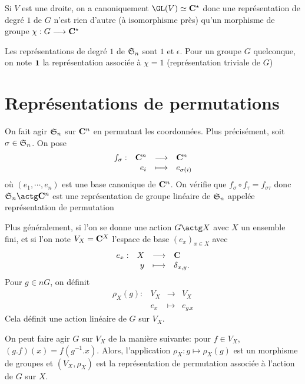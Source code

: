 \begin{rem}
    Si $V$ est une droite, on a canoniquement  $\GL(V)\simeq \C^\star$ donc une représentation de degré $1$ de $G$ n'est rien d'autre (à isomorphisme près) qu'un morphisme de groupe  $\chi : G \longrightarrow  \mathbf C^\star$
\end{rem}

\begin{ex}
    Les représentations de degré $1$ de $\mathfrak S_n$ sont  $1$ et  $\epsilon$. Pour un groupe  $G$ quelconque, on note $\bm{1}$ la représentation associée à  $\chi=1$ (représentation triviale de $G$)
\end{ex}

\section{Représentations de permutations}

On fait agir $\mathfrak S_n$ sur  $\mathbf C^n$ en permutant les coordonnées. Plus précisément, soit $\sigma \in  \mathfrak S_n$. On pose \[
\begin{array}{rrcl}
    f_\sigma:& \mathbf C^n & \longrightarrow & \mathbf C^n \\
             & e_i & \longmapsto & \displaystyle e_{\sigma(i)}
\end{array}
\] 
où $(e_1, \cdots , e_n)$ est une base canonique de $ \mathbf C^n$. On vérifie que $f_\sigma\circ f_\tau=f_{\sigma \tau}$ donc $\gS_n\actg \C^n$ est une représentation de groupe linéaire de $\mathfrak S_n$ appelée représentation de permutation



Plus généralement, si l'on se donne une action  $G\actg X$ avec  $X$ un ensemble fini, et si l'on note  $V_X=\mathbf C^X$ l'espace de base $(e_x)_{x \in  X}$ avec \[
\begin{array}{rrcl}
    e_x:& X & \longrightarrow & \mathbf C \\
    & y & \longmapsto & \displaystyle \delta_{x,y}.
\end{array}
\] 
Pour $g \in n G$, on définit  \[
\begin{array}{rrcl}
    \rho_X(g):& V_X & \longrightarrow & V_X \\
    & e_x & \longmapsto & \displaystyle e_{g.x}
\end{array}
\] 
Cela définit une action linéaire de $G$ sur  $V_X$.

\begin{rem}
    On peut faire agir $G$ sur  $V_X$ de la manière suivante: pour  $f \in  V_X$, $(g.f)(x)=f(g^{-1}.x)$. Alors, l'application $\rho_X:g\longmapsto \rho_X(g)$ est un morphisme de groupes et $(V_X, \rho_X)$ est la représentation de permutation associée à l'action de  $G$ sur  $X$.
\end{rem}


